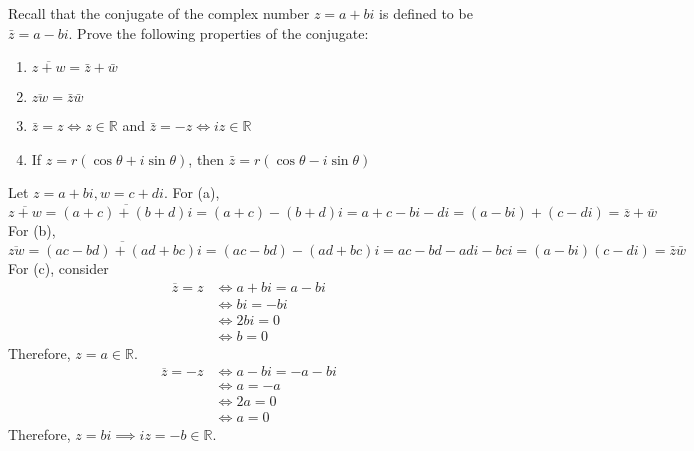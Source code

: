   \begin{exercise}[Shifrin 2.3.2.a/b/c]
    Recall that the conjugate of the complex number $z = a + bi$ is defined to be $\bar{z} = a - bi$. Prove the following properties of the conjugate:
    \begin{enumerate}
      \item $\overline{z + w} = \bar{z} + \bar{w}$
      \item $\overline{zw} = \bar{z}\bar{w}$
      \item $\bar{z} = z \iff z \in \mathbb{R}$ and $\bar{z} = -z \iff iz \in \mathbb{R}$
      \item If $z = r(\cos\theta + i\sin\theta)$, then $\bar{z} = r(\cos\theta - i\sin\theta)$
    \end{enumerate}
  \end{exercise}
  \begin{solution}
    Let $z = a + bi, w = c + di$. For (a), 
    \begin{equation}
      \overline{z + w} = \overline{(a + c) + (b + d)i} = (a + c) - (b + d)i = a + c - bi - di = (a - bi) + (c - di) = \overline{z} + \overline{w}
    \end{equation} 
    For (b), 
    \begin{equation}
      \overline{zw} = \overline{(ac - bd) + (ad + bc)i} = (ac - bd) - (ad + bc)i = ac - bd - adi - bci = (a - bi)(c - di) = \bar{z}\bar{w}
    \end{equation}
    For (c), consider 
    \begin{align}
      \overline{z} = z & \iff a + bi = a - bi \\
                       & \iff bi = -bi \\
                       & \iff 2bi = 0 \\
                       & \iff b = 0 && \tag{field has no 0 divisors}
    \end{align}
    Therefore, $z = a \in \mathbb{R}$. 
    \begin{align}
      \overline{z} = -z & \iff a - bi = -a - bi \\
                        & \iff a = -a \\
                        & \iff 2a = 0 \\
                        & \iff a = 0 && \tag{field has no 0 divisors.}
    \end{align}
    Therefore, $z = bi \implies iz = -b \in \mathbb{R}$. 
  \end{solution}

